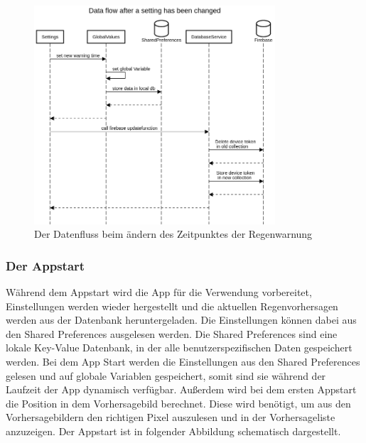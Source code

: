 \begin{figure}[H]
 \centering
 \includegraphics[width=0.8\textwidth,angle=0]{abb/sequence_diagram_change_settings}
 \caption[Sequencediagram Einstellungen ändern]{Der Datenfluss beim ändern des Zeitpunktes der Regenwarnung}
\label{fig:sequence_diagram_change_settings}
\end{figure}

\subsubsection{Der Appstart}
Während dem Appstart wird die App für die Verwendung vorbereitet, Einstellungen werden wieder hergestellt und
die aktuellen Regenvorhersagen werden aus der Datenbank heruntergeladen. 
Die Einstellungen können dabei aus den Shared Preferences ausgelesen werden. 
Die Shared Preferences sind eine lokale Key-Value Datenbank, in der alle benutzerspezifischen Daten gespeichert werden. 
Bei dem App Start werden die Einstellungen aus den Shared Preferences gelesen und auf globale Variablen gespeichert, somit
sind sie während der Laufzeit der App dynamisch verfügbar. 
Außerdem wird bei dem ersten Appstart die Position in dem Vorhersagebild berechnet. 
Diese wird benötigt, um aus den Vorhersagebildern den richtigen Pixel auszulesen und in der Vorhersageliste anzuzeigen.
Der Appstart ist in folgender Abbildung schematisch dargestellt.

